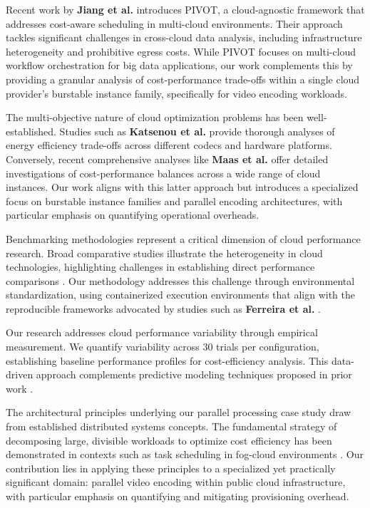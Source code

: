 \documentclass[conference]{IEEEtran}
\begin{document}
	Recent work by \textbf{Jiang et al.} \cite{b20} introduces PIVOT, a cloud-agnostic framework that addresses cost-aware scheduling in multi-cloud environments. Their approach tackles significant challenges in cross-cloud data analysis, including infrastructure heterogeneity and prohibitive egress costs. While PIVOT focuses on multi-cloud workflow orchestration for big data applications, our work complements this by providing a granular analysis of cost-performance trade-offs within a single cloud provider's burstable instance family, specifically for video encoding workloads.
	
	The multi-objective nature of cloud optimization problems has been well-established. Studies such as \textbf{Katsenou et al.} \cite{b8} provide thorough analyses of energy efficiency trade-offs across different codecs and hardware platforms. Conversely, recent comprehensive analyses like \textbf{Maas et al.} \cite{b1} offer detailed investigations of cost-performance balances across a wide range of cloud instances. Our work aligns with this latter approach but introduces a specialized focus on burstable instance families and parallel encoding architectures, with particular emphasis on quantifying operational overheads.
	
	Benchmarking methodologies represent a critical dimension of cloud performance research. Broad comparative studies illustrate the heterogeneity in cloud technologies, highlighting challenges in establishing direct performance comparisons \cite{b18, b1}. Our methodology addresses this challenge through environmental standardization, using containerized execution environments that align with the reproducible frameworks advocated by studies such as \textbf{Ferreira et al.} \cite{b9}.
	
	Our research addresses cloud performance variability through empirical measurement. We quantify variability across 30 trials per configuration, establishing baseline performance profiles for cost-efficiency analysis. This data-driven approach complements predictive modeling techniques proposed in prior work \cite{b10, b11}.
	
	The architectural principles underlying our parallel processing case study draw from established distributed systems concepts. The fundamental strategy of decomposing large, divisible workloads to optimize cost efficiency has been demonstrated in contexts such as task scheduling in fog-cloud environments \cite{b12, b13}. Our contribution lies in applying these principles to a specialized yet practically significant domain: parallel video encoding within public cloud infrastructure, with particular emphasis on quantifying and mitigating provisioning overhead.
	
\end{document}
